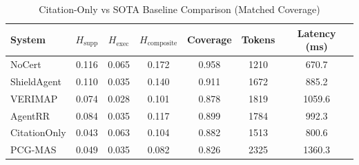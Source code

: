 \begin{table}[h]
\centering
\small
\caption{Citation-Only vs SOTA Baseline Comparison (Matched Coverage)}
\label{tab:validation_preview_citation_only}
\begin{tabular}{l|cc|c|c|cc}
\hline
System & $H_{\mathrm{supp}}$ & $H_{\mathrm{exec}}$ & $H_{\mathrm{composite}}$ & Coverage & Tokens & Latency (ms) \\
\hline
NoCert & 0.116 & 0.065 & 0.172 & 0.958 & 1210 & 670.7 \\
ShieldAgent & 0.110 & 0.035 & 0.140 & 0.911 & 1672 & 885.2 \\
VERIMAP & 0.074 & 0.028 & 0.101 & 0.878 & 1819 & 1059.6 \\
AgentRR & 0.084 & 0.035 & 0.117 & 0.899 & 1784 & 992.3 \\
CitationOnly & 0.043 & 0.063 & 0.104 & 0.882 & 1513 & 800.6 \\
PCG-MAS & 0.049 & 0.035 & 0.082 & 0.826 & 2325 & 1360.3 \\
\hline
\end{tabular}
\end{table}
